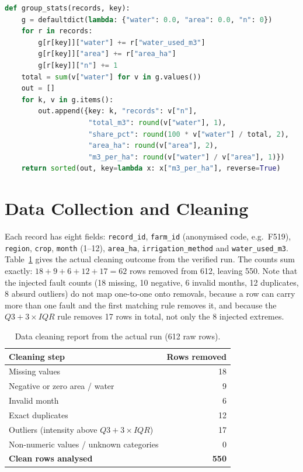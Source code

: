 \documentclass[11pt,a4paper]{article}
\begin{document}
\begin{lstlisting}[language=Python, caption={Grouping, share and intensity
  (extract from \texttt{group\_stats}).}, label={lst:stats}]
def group_stats(records, key):
    g = defaultdict(lambda: {"water": 0.0, "area": 0.0, "n": 0})
    for r in records:
        g[r[key]]["water"] += r["water_used_m3"]
        g[r[key]]["area"] += r["area_ha"]
        g[r[key]]["n"] += 1
    total = sum(v["water"] for v in g.values())
    out = []
    for k, v in g.items():
        out.append({key: k, "records": v["n"],
                    "total_m3": round(v["water"], 1),
                    "share_pct": round(100 * v["water"] / total, 2),
                    "area_ha": round(v["area"], 2),
                    "m3_per_ha": round(v["water"] / v["area"], 1)})
    return sorted(out, key=lambda x: x["m3_per_ha"], reverse=True)
\end{lstlisting}

\section{Data Collection and Cleaning}
Each record has eight fields: \texttt{record\_id}, \texttt{farm\_id} (anonymised code,
e.g.\ F519), \texttt{region}, \texttt{crop}, \texttt{month} (1--12),
\texttt{area\_ha}, \texttt{irrigation\_method} and \texttt{water\_used\_m3}.
Table~\ref{tab:clean} gives the actual cleaning outcome from the verified run.
The counts sum exactly: $18 + 9 + 6 + 12 + 17 = 62$ rows removed from 612, leaving 550.
Note that the injected fault counts (18 missing, 10 negative, 6 invalid months, 12
duplicates, 8 absurd outliers) do not map one-to-one onto removals, because a row can
carry more than one fault and the first matching rule removes it, and because the
$Q3 + 3 \times IQR$ rule removes 17 rows in total, not only the 8 injected extremes.

\begin{table}[h]
\centering\small
\caption{Data cleaning report from the actual run (612 raw rows).}
\label{tab:clean}
\begin{tabular}{lr}
\toprule
Cleaning step & Rows removed \\
\midrule
Missing values & 18 \\
Negative or zero area / water & 9 \\
Invalid month & 6 \\
Exact duplicates & 12 \\
Outliers (intensity above $Q3 + 3 \times IQR$) & 17 \\
Non-numeric values / unknown categories & 0 \\
\midrule
\textbf{Clean rows analysed} & \textbf{550} \\
\bottomrule
\end{tabular}
\end{table}
\end{document}
